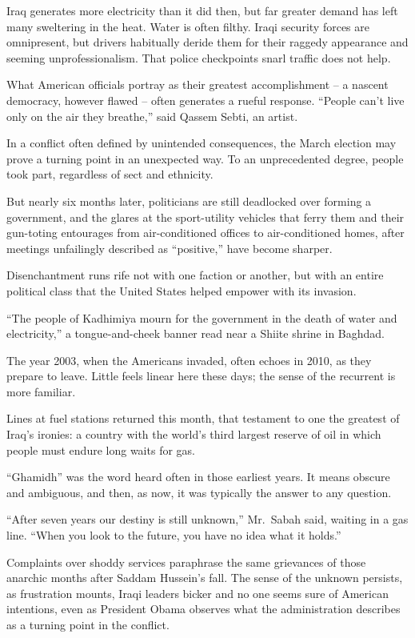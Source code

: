 ﻿\documentclass[12pt]{article}
\begin{document}
Iraq generates more electricity than it did then, but far greater demand has left many sweltering in
the heat. Water is often filthy. Iraqi security forces are omnipresent, but drivers habitually
deride them for their raggedy appearance and seeming unprofessionalism. That police checkpoints
snarl traffic does not help.

What American officials portray as their greatest accomplishment -- a nascent democracy, however
flawed -- often generates a rueful response. ``People can't live only on the air they breathe,''
said Qassem Sebti, an artist.

In a conflict often defined by unintended consequences, the March election may prove a turning point
in an unexpected way. To an unprecedented degree, people took part, regardless of sect and
ethnicity.

But nearly six months later, politicians are still deadlocked over forming a government, and the
glares at the sport-utility vehicles that ferry them and their gun-toting entourages from
air-conditioned offices to air-conditioned homes, after meetings unfailingly described as
``positive,'' have become sharper.

Disenchantment runs rife not with one faction or another, but with an entire political class that
the United States helped empower with its invasion.

``The people of Kadhimiya mourn for the government in the death of water and electricity,'' a
tongue-and-cheek banner read near a Shiite shrine in Baghdad.

The year 2003, when the Americans invaded, often echoes in 2010, as they prepare to leave. Little
feels linear here these days; the sense of the recurrent is more familiar.

Lines at fuel stations returned this month, that testament to one the greatest of Iraq's ironies: a
country with the world's third largest reserve of oil in which people must endure long waits for
gas.

``Ghamidh'' was the word heard often in those earliest years. It means obscure and ambiguous, and
then, as now, it was typically the answer to any question.

``After seven years our destiny is still unknown,'' Mr.~Sabah said, waiting in a gas line. ``When
you look to the future, you have no idea what it holds.''

Complaints over shoddy services paraphrase the same grievances of those anarchic months after Saddam
Hussein's fall. The sense of the unknown persists, as frustration mounts, Iraqi leaders bicker and
no one seems sure of American intentions, even as President Obama observes what the administration
describes as a turning point in the conflict.
\end{document}

